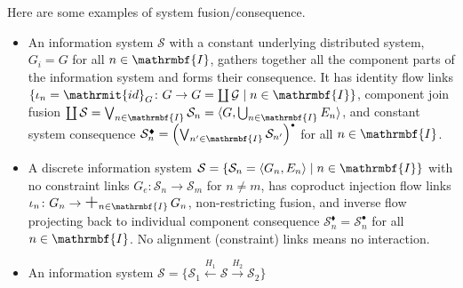 \documentclass{amsart}
\theoremstyle{remark}
\theoremstyle{definition}
\begin{document}
Here are some examples of system fusion/consequence.
%
\begin{itemize}
%
\item 
An information system $\mathcal{S}$ with a constant underlying distributed system,
$G_{i} = G$ for all $n \in \mathrmbf{I}$,
gathers together all the component parts of the information system and forms their consequence.
It has identity flow links
$\{ \iota_{n} = \mathrmit{id}_{G} \colon G \rightarrow G = \coprod\mathcal{G} \mid n \in \mathrmbf{I} \}$,
component join fusion 
$\coprod\mathcal{S} 
= \bigvee_{n \in \mathrmbf{I}}\mathcal{S}_{n}
= {\langle{G,\bigcup_{n \in \mathrmbf{I}}E_{n}}\rangle}$,
and constant system consequence
$\mathcal{S}^{\scriptscriptstyle\blacklozenge}_{n}
= \left(\bigvee_{n' \in \mathrmbf{I}}\mathcal{S}_{n'}\right)^{\scriptscriptstyle\bullet}$
for all $n \in \mathrmbf{I}$.
%
\item 
A discrete information system $\mathcal{S} = \{ \mathcal{S}_{n}={\langle{G_{n},E_{n}}\rangle} \mid n \in \mathrmbf{I} \}$
with no constraint links $G_{e} \colon \mathcal{S}_{n} \rightarrow \mathcal{S}_{m}$ for $n \neq m$,
has coproduct injection flow links
$\iota_{n} \colon G_{n} \rightarrow \mbox{\Large$+$}_{n \in \mathrmbf{I}}\,G_{n}$,
non-restricting fusion,
and inverse flow projecting back to individual component consequence
$\mathcal{S}^{\scriptscriptstyle\blacklozenge}_{n}
= \mathcal{S}_{n}^{\scriptscriptstyle\bullet}$
for all $n \in \mathrmbf{I}$.
No alignment (constraint) links means no interaction.
%
%
\item 
An information system 
$\mathcal{S} = \{ \mathcal{S}_{1} \xleftarrow{H_{1}} \mathcal{S} \xrightarrow{H_{2}} \mathcal{S}_{2} \}$ 

\end{itemize}
\end{document}
